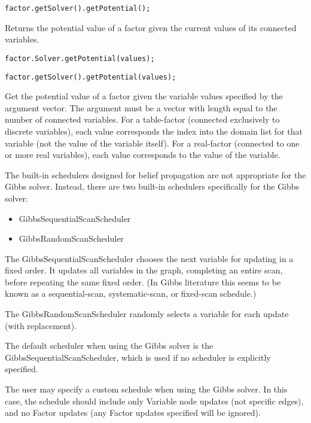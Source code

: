 \ifjava
\begin{lstlisting}
factor.getSolver().getPotential();
\end{lstlisting}
\fi

Returns the potential value of a factor given the current values of its connected variables.

\ifmatlab
\begin{lstlisting}
factor.Solver.getPotential(values);
\end{lstlisting}
\fi

\ifjava
\begin{lstlisting}
factor.getSolver().getPotential(values);
\end{lstlisting}
\fi

Get the potential value of a factor given the variable values specified by the argument vector. The argument must be a vector with length equal to the number of connected variables. For a table-factor (connected exclusively to discrete variables), each value corresponds the index into the domain list for that variable (not the value of the variable itself). For a real-factor (connected to one or more real variables), each value corresponds to the value of the variable.


The built-in schedulers designed for belief propagation are not appropriate for the Gibbs solver.  Instead, there are two built-in schedulers specifically for the Gibbs solver:

\begin{itemize}
\item GibbsSequentialScanScheduler
\item GibbsRandomScanScheduler
\end{itemize}

The GibbsSequentialScanScheduler chooses the next variable for updating in a fixed order. It updates all variables in the graph, completing an entire scan, before repeating the same fixed order. (In Gibbs literature this seems to be known as a sequential-scan, systematic-scan, or fixed-scan schedule.)

The GibbsRandomScanScheduler randomly selects a variable for each update (with replacement).

The default scheduler when using the Gibbs solver is the GibbsSequentialScanScheduler, which is used if no scheduler is explicitly specified.

The user may specify a custom schedule when using the Gibbs solver.  In this case, the schedule should include only Variable node updates (not specific edges), and no Factor updates (any Factor updates specified will be ignored).

